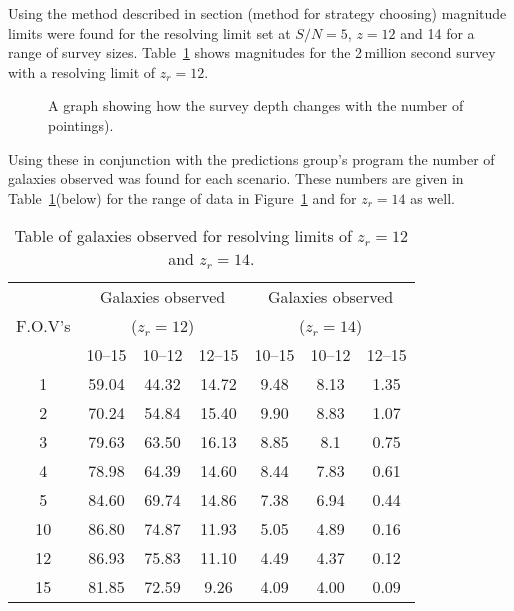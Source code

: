 	Using the method described in section (method for strategy choosing) magnitude limits were found for the resolving limit set at $S/N=5$, $z=12$ and 14 for a range of survey sizes. Table~\ref{tab:galaxies_observed_for_resolving_limits_high_z} shows magnitudes for the 2\,million second survey with a resolving limit of $z_r=12$.
	\begin{figure}[!htbp]
		\centering
			\begingroup{}
				\resizebox{0.8\textwidth}{!}{%
					
				}\endgroup
		\caption{A graph showing how the survey depth changes with the number of pointings).\label{fig:survey_depth_changes_with_the_number_of_pointings}}
	\end{figure}
	Using these in conjunction with the predictions group’s program the number of galaxies observed was found for each scenario. These numbers are given in Table~\ref{tab:galaxies_observed_for_resolving_limits_high_z}(below) for the range of data in Figure~\ref{fig:survey_depth_changes_with_the_number_of_pointings} and for $z_r=14$ as well.
	\begin{table}[!htbp]
		\begin{center}
			\begin{tabular}{c|c|c|c|c|c|c}
				\multirow{3}{*}{F.O.V's} & \multicolumn{3}{c|}{Galaxies observed} & \multicolumn{3}{c}{Galaxies observed} \\
				 & \multicolumn{3}{|c}{($z_r=12$)} & \multicolumn{3}{|c}{($z_r=14$)} \\
				\cline{2-7}
				& 10--15 & 10--12 & 12--15 & 10--15 & 10--12 & 12--15 \\
								\hline\hline
				1 	& 59.04 	& 44.32 	& 14.72	& 9.48 	& 8.13 	& 1.35 \\
				2 	& 70.24 	& 54.84 	& 15.40	& 9.90 	& 8.83 	& 1.07 \\
				3 	& 79.63 	& 63.50 	& 16.13	& 8.85 	& 8.1 	& 0.75 \\
				4 	& 78.98 	& 64.39 	& 14.60	& 8.44 	& 7.83 	& 0.61 \\
				5 	& 84.60 	& 69.74 	& 14.86	& 7.38 	& 6.94 	& 0.44 \\
				10 	& 86.80 	& 74.87 	& 11.93	& 5.05 	& 4.89 	& 0.16 \\
				12 	& 86.93 	& 75.83 	& 11.10	& 4.49 	& 4.37 	& 0.12 \\
				15 	& 81.85 	& 72.59 	& 9.26 	& 4.09 	& 4.00 	& 0.09
			\end{tabular}
		\end{center}
		\caption{Table of galaxies observed for resolving limits of $z_r=12$ and $z_r=14$.\label{tab:galaxies_observed_for_resolving_limits_high_z}}
	\end{table}

